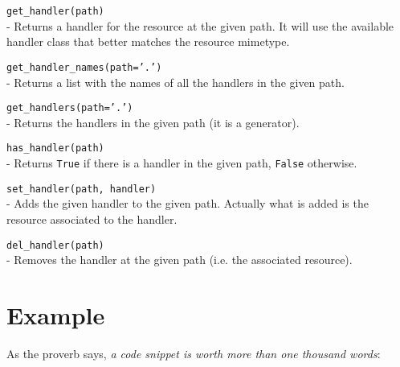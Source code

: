\begin{api}
  {\tt get\_handler(path)}\\
  - Returns a handler for the resource at the given path. It will use the
    available handler class that better matches the resource mimetype.

  {\tt get\_handler\_names(path='.')}\\
  - Returns a list with the names of all the handlers in the given path.

  {\tt get\_handlers(path='.')}\\
  - Returns the handlers in the given path (it is a generator).

  {\tt has\_handler(path)}\\
  - Returns {\tt True} if there is a handler in the given path, {\tt False}
    otherwise.

  {\tt set\_handler(path, handler)}\\
  - Adds the given handler to the given path. Actually what is added is
    the resource associated to the handler.

  {\tt del\_handler(path)}\\
  - Removes the handler at the given path (i.e. the associated resource).
\end{api}


\section{Example}

As the proverb says, {\em a code snippet is worth more than one thousand
words}:

